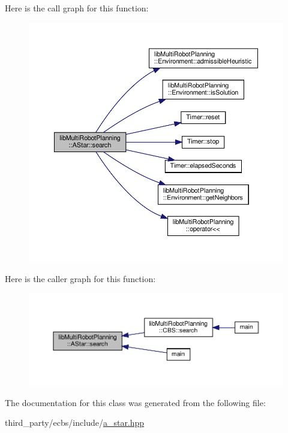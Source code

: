 Here is the call graph for this function\+:
\nopagebreak
\begin{figure}[H]
\begin{center}
\leavevmode
\includegraphics[width=350pt]{classlib_multi_robot_planning_1_1_a_star_acd703d42817f39d6027fa6432ca17ac9_cgraph}
\end{center}
\end{figure}
Here is the caller graph for this function\+:
\nopagebreak
\begin{figure}[H]
\begin{center}
\leavevmode
\includegraphics[width=350pt]{classlib_multi_robot_planning_1_1_a_star_acd703d42817f39d6027fa6432ca17ac9_icgraph}
\end{center}
\end{figure}


The documentation for this class was generated from the following file\+:\begin{DoxyCompactItemize}
\item 
third\+\_\+party/ecbs/include/\hyperlink{a__star_8hpp}{a\+\_\+star.\+hpp}\end{DoxyCompactItemize}
